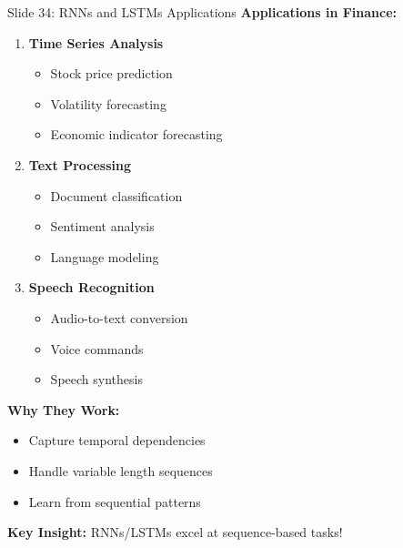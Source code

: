 \documentclass[8pt]{beamer}
\begin{document}
	\begin{frame}{Slide 34: RNNs and LSTMs Applications}
		\fontsize{6.5}{7.5}\selectfont
		\textbf{Applications in Finance:}
		\begin{enumerate}
			\item \textbf{Time Series Analysis}
			\begin{itemize}
				\item Stock price prediction
				\item Volatility forecasting
				\item Economic indicator forecasting
			\end{itemize}
			\item \textbf{Text Processing}
			\begin{itemize}
				\item Document classification
				\item Sentiment analysis
				\item Language modeling
			\end{itemize}
			\item \textbf{Speech Recognition}
			\begin{itemize}
				\item Audio-to-text conversion
				\item Voice commands
				\item Speech synthesis
			\end{itemize}
		\end{enumerate}
		
		\vspace{0.1cm}
		\textbf{Why They Work:}
		\begin{itemize}
			\item Capture temporal dependencies
			\item Handle variable length sequences
			\item Learn from sequential patterns
		\end{itemize}
		
		\textcolor{myblue}{\textbf{Key Insight:}} RNNs/LSTMs excel at sequence-based tasks!
	\end{frame}
	
\end{document}
